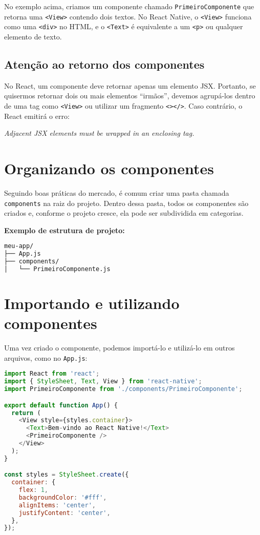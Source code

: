 No exemplo acima, criamos um componente chamado \texttt{PrimeiroComponente} que retorna uma \texttt{<View>} contendo dois textos. No React Native, o \texttt{<View>} funciona como uma \texttt{<div>} no HTML, e o \texttt{<Text>} é equivalente a um \texttt{<p>} ou qualquer elemento de texto.

\subsection*{Atenção ao retorno dos componentes}

No React, um componente deve retornar apenas um elemento JSX. Portanto, se quisermos retornar dois ou mais elementos “irmãos”, devemos agrupá-los dentro de uma tag como \texttt{<View>} ou utilizar um fragmento \texttt{<></>}. Caso contrário, o React emitirá o erro:

\textit{Adjacent JSX elements must be wrapped in an enclosing tag.}

\section{Organizando os componentes}

Seguindo boas práticas do mercado, é comum criar uma pasta chamada \texttt{components} na raiz do projeto. Dentro dessa pasta, todos os componentes são criados e, conforme o projeto cresce, ela pode ser subdividida em categorias.

\textbf{Exemplo de estrutura de projeto:}

\begin{lstlisting}[language=bash]
meu-app/
├── App.js
├── components/
│   └── PrimeiroComponente.js
\end{lstlisting}

\section{Importando e utilizando componentes}

Uma vez criado o componente, podemos importá-lo e utilizá-lo em outros arquivos, como no \texttt{App.js}:

\begin{lstlisting}[language=JavaScript, caption={Importando e utilizando um componente personalizado}]
import React from 'react';
import { StyleSheet, Text, View } from 'react-native';
import PrimeiroComponente from './components/PrimeiroComponente';

export default function App() {
  return (
    <View style={styles.container}>
      <Text>Bem-vindo ao React Native!</Text>
      <PrimeiroComponente />
    </View>
  );
}

const styles = StyleSheet.create({
  container: {
    flex: 1,
    backgroundColor: '#fff',
    alignItems: 'center',
    justifyContent: 'center',
  },
});
\end{lstlisting}


